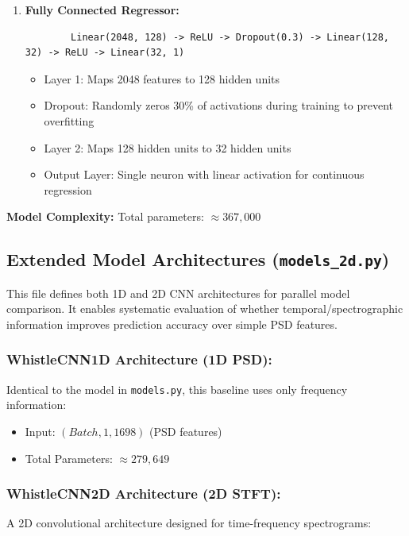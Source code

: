 \begin{enumerate}
    \item \textbf{Fully Connected Regressor:}
    \begin{verbatim}
        Linear(2048, 128) -> ReLU -> Dropout(0.3) -> Linear(128, 32) -> ReLU -> Linear(32, 1)
    \end{verbatim}

    \begin{itemize}
        \item Layer 1: Maps 2048 features to 128 hidden units
        \item Dropout: Randomly zeros 30\% of activations during training to prevent overfitting
        \item Layer 2: Maps 128 hidden units to 32 hidden units
        \item Output Layer: Single neuron with linear activation for continuous regression
    \end{itemize}
\end{enumerate}

\textbf{Model Complexity:}
Total parameters: $\approx 367,000$

\subsection{Extended Model Architectures (\texttt{models\_2d.py})}

This file defines both 1D and 2D CNN architectures for parallel model comparison. It enables systematic 
evaluation of whether temporal/spectrographic information improves prediction accuracy over simple PSD features.

\subsubsection{WhistleCNN1D Architecture (1D PSD):}

Identical to the model in \verb|models.py|, this baseline uses only frequency information:
\begin{itemize}
    \item Input: $(Batch, 1, 1698)$ (PSD features)
    \item Total Parameters: $\approx 279,649$
\end{itemize}

\subsubsection{WhistleCNN2D Architecture (2D STFT):}
A 2D convolutional architecture designed for time-frequency spectrograms:

